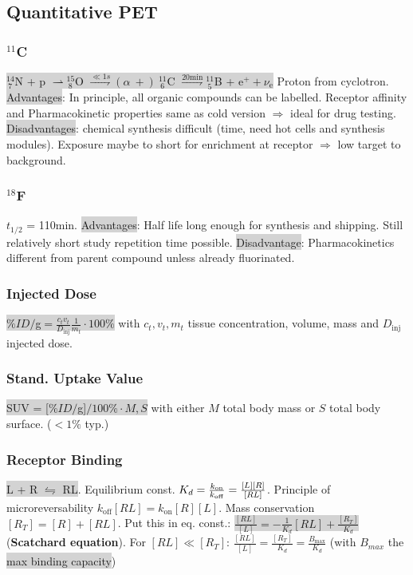 \documentclass[9pt]{article}
\newcommand{\grey}[1]{\setlength{\fboxsep}{0pt}\colorbox{lightgrey}{#1}}
\begin{document}
\begin{multicols}{2}
\subsection{Quantitative PET}

\subsubsection{${}^{11}$C}
\grey{${}^{14}_{\ 7}$N + p $\rightharpoonup {}^{15}_{\ 8}$O $\overset{\ll 1s}{\rightharpoondown} (\alpha \: +) \ {}^{11}_{\ 6}$C $\overset{20\mathrm{min}}{\rightharpoondown} {}^{11}_{\ 5}$B + e${}^+ + \nu_\mathrm{e}$}
Proton from cyclotron. \grey{Advantages}: In principle, all organic compounds can be labelled. Receptor affinity and Pharmacokinetic properties same as cold version $\Rightarrow$ ideal for drug testing.  \grey{Disadvantages}: chemical synthesis difficult (time, need hot cells and synthesis modules). Exposure maybe to short for enrichment at receptor $\Rightarrow$ low target to background.

\subsubsection{${}^{18}$F}$t_{1/2}$ = 110min. \grey{Advantages}: Half life long enough for synthesis and shipping. Still relatively short study repetition time possible. \grey{Disadvantage}: Pharmacokinetics different from parent compound unless already fluorinated.

\subsubsection{Injected Dose} 
\grey{$\%ID/$g$ = \frac{c_tv_t}{D_\mathrm{inj}} \frac{1}{m_t} \cdot 100\%$} with $c_t,v_t,m_t$ tissue concentration, volume, mass and $D_\mathrm{inj}$ injected dose.

\subsubsection{Stand. Uptake Value} 
\grey{SUV = [$\%ID/$g]$ / 100\% \cdot M,S$} with either $M$ total body mass or $S$ total body surface. ($<1\%$ typ.)

\subsubsection{Receptor Binding} \grey{L + R $\leftrightharpoons$ RL}. Equilibrium const. $K_d = {k_\mathrm{on} \over k_\mathrm{off}} = \frac{[L][R]}{[RL]}$. Principle of microreversability $k_\mathrm{off} [RL] = k_\mathrm{on}[R][L]$. Mass conservation $[R_T] = [R]+[RL]$. Put this in eq. const.: \grey{$\frac{[RL]}{[L]} = -\frac{1}{K_d}[RL] + \frac{[R_T]}{K_d}$} (\textbf{Scatchard equation}). For $[RL]\ll[R_T]$: $\frac{[RL]}{[L]} = \frac{[R_T]}{K_d} = \frac{B_\mathrm{max}}{K_d}$ (with $B_{max}$ the \grey{max binding capacity})


\end{multicols}
\end{document}
